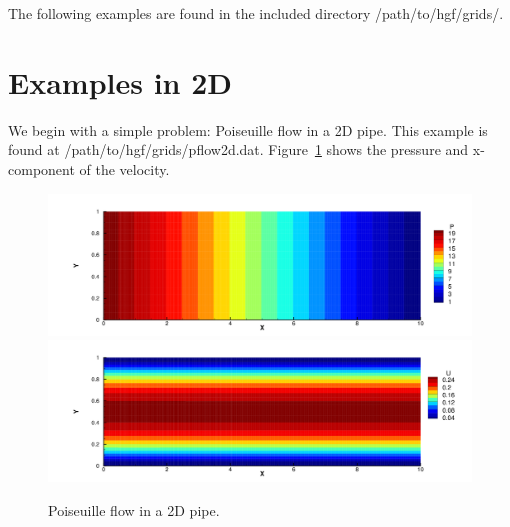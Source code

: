\documentclass{report}
\begin{document}
\noindent The following examples are found in the included directory /path/to/hgf/grids/.\\

\section{Examples in 2D}

\noindent We begin with a simple problem: Poiseuille flow in a 2D pipe. This
example is found at /path/to/hgf/grids/pflow2d.dat. Figure~\ref{fig:2dpflow}
shows the pressure and x-component of the velocity.\\
\begin{figure}
  \centering
  \includegraphics[width=.9\textwidth]{images/pflow2dP.png}\\
  \includegraphics[width=.9\textwidth]{images/pflow2dU.png}
  \caption{\label{fig:2dpflow}Poiseuille flow in a 2D pipe.}
\end{figure}
\end{document}
